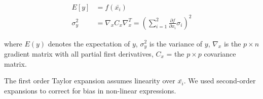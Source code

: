 \begin{align*}
E[y] &= f(\bar{x_i}) \\
\sigma^2_y &= \nabla_x C_x \nabla^T_x=\left(\sum_{i=1}^{2}\frac{\partial{f}}{\partial{x_i}}\sigma_i\right)^2
\end{align*}

where $E(y)$ denotes the expectation of $y$, $\sigma^2_y$ is the variance of $y$, $\nabla_x$ is the $p \times n$ gradient matrix with all partial first derivatives, $C_x$ = the $p \times p$ covariance matrix. 

The first order Taylor expansion assumes linearity over $\bar {x_i}$. We used second-order expansions to correct for bias in non-linear expressions. 
